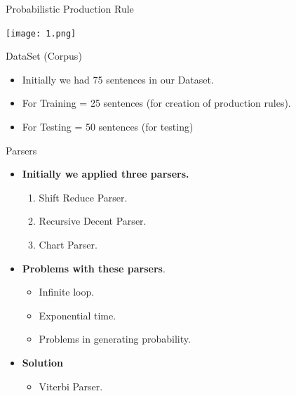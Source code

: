 \documentclass{beamer}
\begin{document}
\begin{frame}{Probabilistic Production Rule}
\begin{center}
	\texttt{[image: 1.png]}	
\end{center}
\end{frame}




\begin{frame}{DataSet (Corpus)}
\begin{itemize}
	\item Initially we had 75 sentences in our Dataset.
	\vspace{1em}
	\item For Training = 25 sentences (for creation of production rules).
	\item For Testing = 50 sentences (for testing)
	\vspace{1em} 
	
\end{itemize}
\end{frame}



%



\begin{frame}{Parsers}
\begin{itemize}
	\item \textbf{Initially we applied three parsers.} \\
	\vspace{0.5em}
	\begin{enumerate}
	\item Shift Reduce Parser.
	\item Recursive Decent Parser.
	\item Chart Parser.
	\end{enumerate}
	\vspace{1em}
	\item  \textbf{Problems with these parsers}. \\
	\vspace{0.5em}
	\begin{itemize}
	\item Infinite loop.
	\item Exponential time.
	\item Problems in generating probability.
	\end{itemize}
	\vspace{1em}
	\item \textbf{Solution}
	\vspace{0.5em}
	\begin{itemize}
	\item Viterbi Parser.
	\end{itemize}	
	\vspace{1em} 
\end{itemize}
\end{frame}
\end{document}
